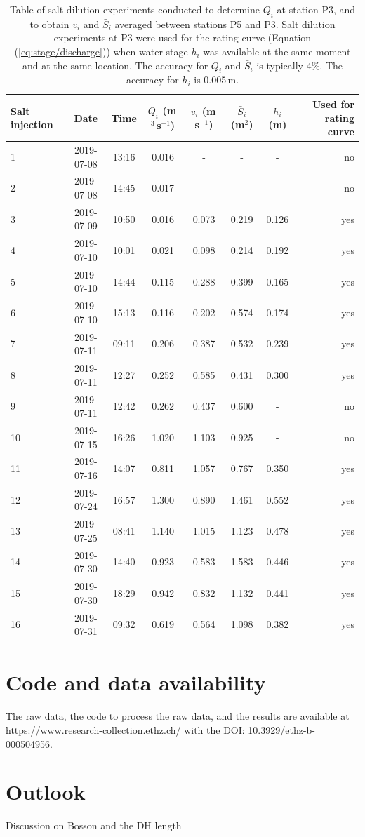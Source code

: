 \begin{table}[H]
\centering
\caption{Table of salt dilution experiments conducted to determine $Q_i$ at station P3, and to obtain $\bar v_i$ and $\bar S_i$ averaged between stations P5 and P3. Salt dilution experiments at P3 were used for the rating curve (Equation (\ref{eq:stage/discharge})) when water stage $h_i$ was available at the same moment and at the same location. The accuracy for $Q_i$ and $\bar S_i$ is typically 4\%. The accuracy for $h_i$ is 0.005\,m.}
\begin{tabular}{l c c c c c c r}
\hline
\textbf{Salt injection} & \textbf{Date} & \textbf{Time} & \textbf{$Q_i$ (m\,$^3$\,s$^{-1}$}) & \textbf{$\bar v_i$ (m\,s$^{-1}$)} & \textbf{$\bar S_i$ (m$^2$)} & \textbf{$h_i$ (m)} & \textbf{Used for rating curve}\\
\hline

1 & 2019-07-08 & 13:16 &  0.016  & - & - & - &no\\
2 & 2019-07-08 & 14:45 &  0.017 & - & - & - &no \\
3 & 2019-07-09 & 10:50 &  0.016 & 0.073 & 0.219 & 0.126 &yes\\
4 & 2019-07-10 & 10:01 &  0.021 & 0.098 & 0.214 & 0.192 &yes \\
5 & 2019-07-10 & 14:44 &  0.115 & 0.288 & 0.399 & 0.165 &yes \\
6 & 2019-07-10 & 15:13 & 0.116 & 0.202 & 0.574 & 0.174 &yes\\
7 & 2019-07-11 & 09:11 &  0.206 & 0.387 & 0.532 & 0.239 &yes \\
8 & 2019-07-11 & 12:27 &  0.252 & 0.585 & 0.431 & 0.300 &yes\\
9 & 2019-07-11 & 12:42 &  0.262 & 0.437 & 0.600 & - &no\\
10 & 2019-07-15 & 16:26 &  1.020 & 1.103 & 0.925 & - &no\\
11 & 2019-07-16 & 14:07 &  0.811 & 1.057 & 0.767 & 0.350 &yes \\
12 & 2019-07-24 & 16:57 &  1.300 & 0.890 & 1.461 & 0.552 &yes \\
13 & 2019-07-25 & 08:41 &  1.140 & 1.015 & 1.123 & 0.478 &yes\\
14 & 2019-07-30 & 14:40 &  0.923 & 0.583 & 1.583 & 0.446 &yes \\
15 & 2019-07-30 & 18:29 &  0.942 & 0.832 & 1.132 & 0.441 & yes\\
16 & 2019-07-31 & 09:32 &  0.619 & 0.564 & 1.098 & 0.382 & yes \\

\hline
\end{tabular}
\label{table salt dilution}
\end{table}


\section{Code and data availability}

The raw data, the code to process the raw data, and the results are available at \url{https://www.research-collection.ethz.ch/} with the DOI: 10.3929/ethz-b-000504956.


\section{Outlook}

Discussion on Bosson and the DH length

